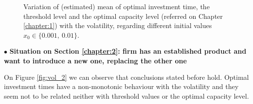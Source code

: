 \begin{figure}[!ht]
	\begin{subfigmatrix}{2}
	\end{subfigmatrix}
	\caption{Variation of (estimated) mean of optimal investment time, the threshold level and the optimal capacity level (referred on Chapter \ref{chapter:1}) with the volatility, regarding different initial values $x_0 \in \{0.001, \ 0.01\}$.}
	\label{fig:var_1}
\end{figure}





$\bullet$ \textbf{Situation on Section \ref{chapter:2}: firm has an established product and want to introduce a new one, replacing the other one}


On Figure \ref{fig:vol_2} we can observe that conclusions stated before hold. Optimal investment times have a non-monotonic behaviour with the volatility and they seem not to be related neither with threshold values or the optimal capacity level. 

